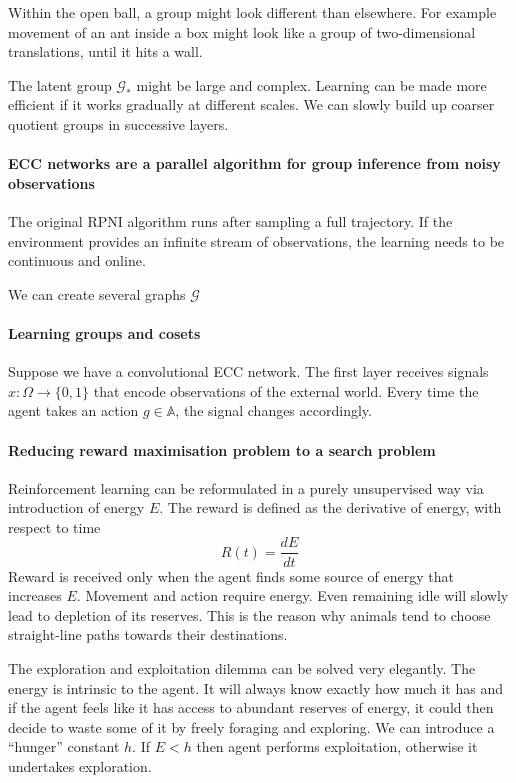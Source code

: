\documentclass[12pt]{article}
\begin{document}
Within the open ball, a group might look different than elsewhere. For example movement of an ant inside a box might look like a group of two-dimensional translations, until it hits a wall. 



The latent group $\mathcal{G}_{*}$ might be large and complex. Learning can be made more efficient if it works gradually at different scales. We can slowly build up coarser quotient groups in successive layers.

\paragraph{ECC networks are a parallel algorithm for group inference from noisy observations}
The original RPNI algorithm runs after sampling a full trajectory. If the environment provides an infinite stream of observations, the learning needs to be continuous and online.  

We can create several graphs $\mathcal{G}$ 


\paragraph{Learning groups and cosets}

Suppose we have a convolutional ECC network. The first layer receives signals $x:\Omega \rightarrow \{0,1\}$ that encode observations of the external world. Every time the agent takes an action $g\in\mathbb{A}$, the signal changes accordingly. 


\paragraph{Reducing reward maximisation problem to a search problem}
Reinforcement learning can be reformulated in a purely unsupervised way via introduction of energy $E$. The reward is defined as the derivative of energy, with respect to time
\[
R(t) = \frac{dE}{dt}
\]
Reward is received only when the agent finds some source of energy that increases $E$.
Movement and action require energy. Even remaining idle will slowly lead to depletion of its reserves. This is the reason why animals tend to choose straight-line paths towards their destinations. 

The exploration and exploitation dilemma can be solved very elegantly. The energy is intrinsic to the agent. It will always know exactly how much it has and if the agent feels like it has access to abundant reserves of energy, it could then decide to waste some of it by freely foraging and exploring. We can introduce a ``hunger'' constant  $h$. If $E<h$ then agent performs exploitation, otherwise it undertakes exploration.
\end{document}
